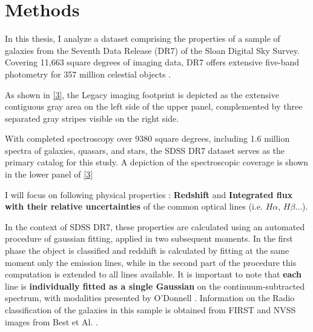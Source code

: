 \chapter{Methods}
In this thesis, I analyze a dataset comprising the properties of a sample of galaxies from the Seventh Data Release (DR7) of the Sloan Digital Sky Survey. Covering 11,663 square degrees of imaging data, DR7 offers extensive five-band photometry for 357 million celestial objects \cite{2009ApJS..182..543A,mpa-sdss-dr7}. 

As shown in  \autoref{3}, the Legacy imaging footprint is depicted as the extensive contiguous gray area on the left side of the upper panel, complemented by three separated gray stripes visible on the right side.

With completed spectroscopy over 9380 square degrees, including 1.6 million spectra of galaxies, quasars, and stars, the SDSS DR7 dataset serves as the primary catalog for this study. A depiction of the spectroscopic coverage is shown in the lower panel of \autoref{3} 
 
I will focus on following physical properties : \textbf{Redshift} and \textbf{Integrated flux with their relative uncertainties} of the common optical lines (i.e. $H\alpha$, $H\beta$...).

In the context of SDSS DR7, these properties are calculated using an automated procedure of gaussian fitting, applied in two subsequent moments. In the first phase the object is classified and redshift is calculated by fitting at the same moment only the emission lines, while in the second part of the procedure this computation is extended to all lines available. It is important to note that \textbf{each} line is \textbf{individually fitted as a single Gaussian} on the continuum-subtracted spectrum, with modalities presented by O'Donnell \cite{1994ApJ...422..158O}. Information on the Radio classification of the galaxies in this sample is obtained from FIRST and NVSS images from Best et Al. \cite{2005MNRAS.362....9B}.

